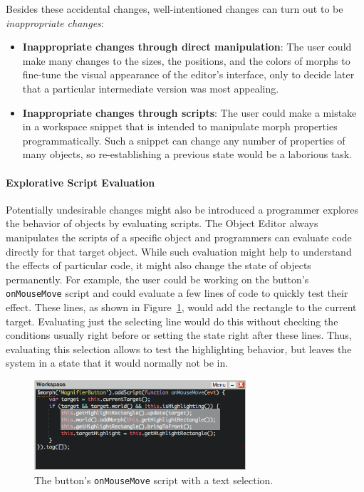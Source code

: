 Besides these accidental changes, well-intentioned changes can turn out to be \emph{inappropriate changes}:

\begin{itemize}
    \item \textbf{Inappropriate changes through direct manipulation}: The user could make many changes to the sizes, the positions, and the colors of morphs to fine-tune the visual appearance of the editor's interface, only to decide later that a particular intermediate version was most appealing.
    \item \textbf{Inappropriate changes through scripts}: The user could make a mistake in a workspace snippet that is intended to manipulate morph properties programmatically. Such a snippet can change any number of properties of many objects, so re-establishing a previous state would be a laborious task.
\end{itemize}

\paragraph{Explorative Script Evaluation}
Potentially undesirable changes might also be introduced a programmer explores the behavior of objects by evaluating scripts.
The Object Editor always manipulates the scripts of a specific object and programmers can evaluate code directly for that target object.
While such evaluation might help to understand the effects of particular code, it might also change the state of objects permanently.
For example, the user could be working on the button's \lstinline{onMouseMove} script and could evaluate a few lines of code to quickly test their effect.
These lines, as shown in Figure~\ref{fig:onMouseOverScript}, would add the rectangle to the current target.
Evaluating just the selecting line would do this without checking the conditions usually right before or setting the state right after these lines.
Thus, evaluating this selection allows to test the highlighting behavior, but leaves the system in a state that it would normally not be in.

\begin{figure}[h]
    \centering
    \includegraphics[width=0.7\textwidth]{figures/3_motivation/4_workspaceDoIt.png}
    \caption{The button's \lstinline{onMouseMove} script with a text selection.}
    \label{fig:onMouseOverScript}
\end{figure}

